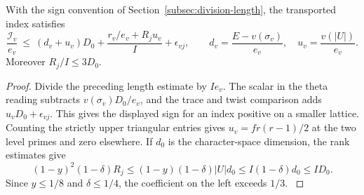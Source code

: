 \begin{lemma}
With the sign convention of Section~\ref{subsec:division-length},
the transported index satisfies
\[
 \frac{\mathcal I_v}{e_v}
 \ \le\ (d_v+u_v)D_0+
              \frac{r_v/e_v+R_j u_v}{I}+\epsilon_{vj},
 \qquad
 d_v=\frac{E-v(\sigma_v)}{e_v},\quad
 u_v=\frac{v(|U|)}{e_v}.
\]
Moreover \(R_j/I\le3D_0\).
\end{lemma}
\begin{proof}
Divide the preceding length estimate by \(Ie_v\). The scalar in
the theta reading subtracts \(v(\sigma_v)D_0/e_v\), and the trace and
twist comparison adds \(u_vD_0+\epsilon_{vj}\). This gives the
displayed sign for an index positive on a smaller lattice.
Counting the strictly upper triangular entries gives
\(u_v=fr(r-1)/2\) at the two level primes and zero elsewhere.
If \(d_0\) is the character-space dimension, the rank estimates give
\[
 (1-y)^2(1-\delta)R_j
 \le (1-y)(1-\delta)|U|d_0
 \le I(1-\delta)d_0\le I D_0.
\]
Since \(y\le1/8\) and \(\delta\le1/4\), the coefficient on the left
exceeds \(1/3\). \label{cor:paired-row-indices-5}
\end{proof}



